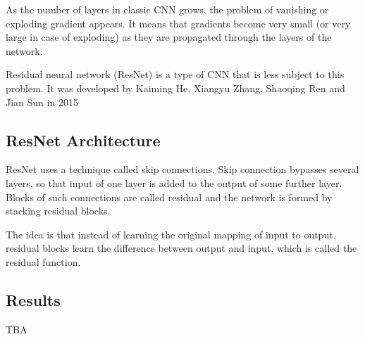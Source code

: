 As the number of layers in classic CNN grows, the problem of vanishing or exploding gradient appears.
It means that gradients become very small (or very large in case of exploding) as they are propagated
through the layers of the network.

Residual neural network (ResNet) is a type of CNN that is less subject to this problem.
It was developed by Kaiming He, Xiangyu Zhang, Shaoqing Ren and Jian Sun in 2015 \cite{residual_neural_network}

\subsection{ResNet Architecture}


ResNet uses a technique called skip connections. Skip connection bypasses several layers, so
that input of one layer is added to the output of some further layer. Blocks of such connections
are called residual and the network is formed by stacking residual blocks.

The idea is that instead of learning the original mapping of input to output, residual blocks
learn the difference between output and input, which is called the residual function.

\subsection{Results}
TBA





















